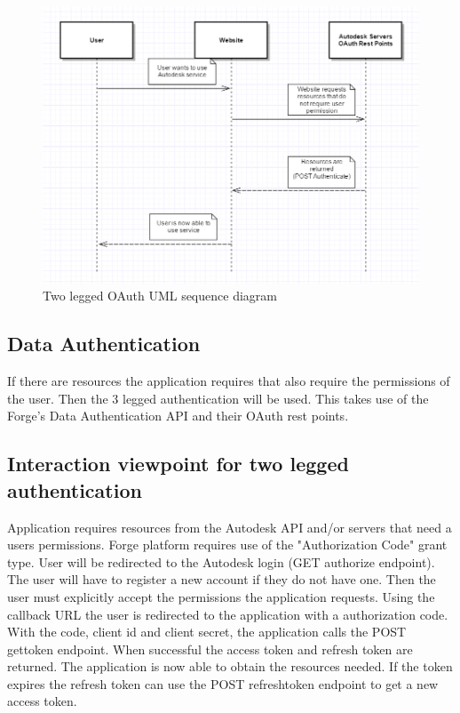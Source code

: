 \documentclass[letterpaper, 10pt, draftclsnofoot, compsoc, onecolumn]{IEEEtran}
\begin{document}
\begin{figure}[ht]
	\includegraphics[scale=0.7]{Authentication2legged.png}
	\caption{Two legged OAuth UML sequence diagram}
\end{figure}

\subsection{Data Authentication}
\label{Three legged} 
	If there are resources the application requires that also require the permissions of the user. Then the 3 legged authentication will be used. This takes use of the Forge's Data Authentication API and their OAuth rest points. 
\subsection{Interaction viewpoint for two legged authentication}
	Application requires resources from the Autodesk API and/or servers that need a users permissions. Forge platform requires use of the "Authorization Code" grant type. User will be redirected to the Autodesk login (GET authorize endpoint). The user will have to register a new account if they do not have one. Then the user must explicitly accept the permissions the application requests. Using the callback URL the user is redirected to the application with a authorization code. With the code, client id and client secret, the application calls the POST gettoken endpoint. When successful the access token and refresh token are returned. The application is now able to obtain the resources needed. If the token expires the refresh token can use the POST refreshtoken endpoint to get a new access token. 
\end{document}
